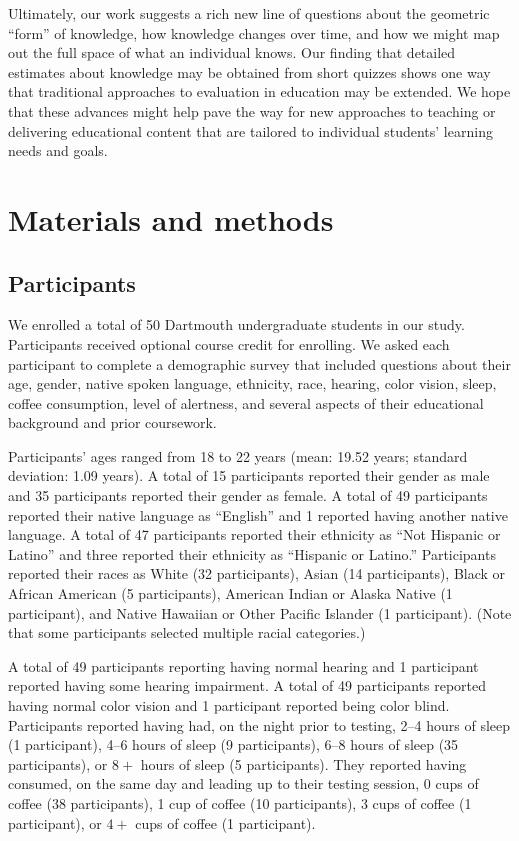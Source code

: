 \documentclass[10pt]{article}
\begin{document}
Ultimately, our work suggests a rich new line of questions about the geometric
``form'' of knowledge, how knowledge changes over time, and how we might map
out the full space of what an individual knows. Our finding that detailed
estimates about knowledge may be obtained from short quizzes shows one way that
traditional approaches to evaluation in education may be extended. We hope that
these advances might help pave the way for new approaches to teaching or
delivering educational content that are tailored to individual students'
learning needs and goals.

\section*{Materials and methods}

\subsection*{Participants}

We enrolled a total of 50 Dartmouth undergraduate students in our study.
Participants received optional course credit for enrolling. We asked each
participant to complete a demographic survey that included questions about
their age, gender, native spoken language, ethnicity, race, hearing, color
vision, sleep, coffee consumption, level of alertness, and several aspects of
their educational background and prior coursework.

Participants' ages ranged from 18 to 22 years (mean: 19.52 years; standard
deviation: 1.09 years). A total of 15 participants reported their gender as
male and 35 participants reported their gender as female. A total of 49
participants reported their native language as ``English'' and 1 reported
having another native language. A total of 47 participants reported their
ethnicity as ``Not Hispanic or Latino'' and three reported their ethnicity as
``Hispanic or Latino.'' Participants reported their races as White (32
participants), Asian (14 participants), Black or African American (5
participants), American Indian or Alaska Native (1 participant), and Native
Hawaiian or Other Pacific Islander (1 participant). (Note that some
participants selected multiple racial categories.)

A total of 49 participants reporting having normal hearing and 1 participant
reported having some hearing impairment. A total of 49 participants reported
having normal color vision and 1 participant reported being color blind.
Participants reported having had, on the night prior to testing, 2--4 hours of
sleep (1 participant), 4--6 hours of sleep (9 participants), 6--8 hours of
sleep (35 participants), or $8+$ hours of sleep (5 participants). They reported
having consumed, on the same day and leading up to their testing session, 0
cups of coffee (38 participants), 1 cup of coffee (10 participants), 3 cups of
coffee (1 participant), or $4+$ cups of coffee (1 participant).
\end{document}
